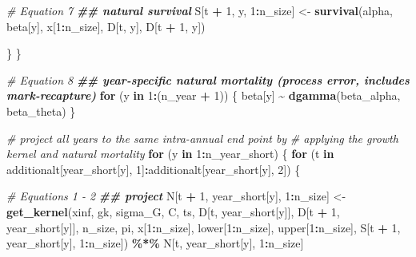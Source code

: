 \documentclass[
]{article}
\newenvironment{Shaded}{\begin{snugshade}}{\end{snugshade}}
\newcommand{\CommentTok}[1]{\textcolor[rgb]{0.56,0.35,0.01}{\textit{#1}}}
\newcommand{\ControlFlowTok}[1]{\textcolor[rgb]{0.13,0.29,0.53}{\textbf{#1}}}
\newcommand{\DecValTok}[1]{\textcolor[rgb]{0.00,0.00,0.81}{#1}}
\newcommand{\DocumentationTok}[1]{\textcolor[rgb]{0.56,0.35,0.01}{\textbf{\textit{#1}}}}
\newcommand{\FunctionTok}[1]{\textcolor[rgb]{0.13,0.29,0.53}{\textbf{#1}}}
\newcommand{\NormalTok}[1]{#1}
\newcommand{\OtherTok}[1]{\textcolor[rgb]{0.56,0.35,0.01}{#1}}
\newcommand{\SpecialCharTok}[1]{\textcolor[rgb]{0.81,0.36,0.00}{\textbf{#1}}}
\begin{document}
\begin{Shaded}
\begin{Highlighting}[]
      \CommentTok{\# Equation 7}
      \DocumentationTok{\#\# natural survival}
\NormalTok{      S[t }\SpecialCharTok{+} \DecValTok{1}\NormalTok{, y, }\DecValTok{1}\SpecialCharTok{:}\NormalTok{n\_size] }\OtherTok{\textless{}{-}} \FunctionTok{survival}\NormalTok{(alpha, beta[y], x[}\DecValTok{1}\SpecialCharTok{:}\NormalTok{n\_size], D[t, y],}
\NormalTok{                                        D[t }\SpecialCharTok{+} \DecValTok{1}\NormalTok{, y])}

\NormalTok{    \}}
\NormalTok{  \}}

  \CommentTok{\# Equation 8}
  \DocumentationTok{\#\# year{-}specific natural mortality (process error, includes mark{-}recapture)}
  \ControlFlowTok{for}\NormalTok{ (y }\ControlFlowTok{in} \DecValTok{1}\SpecialCharTok{:}\NormalTok{(n\_year }\SpecialCharTok{+} \DecValTok{1}\NormalTok{)) \{}
\NormalTok{    beta[y] }\SpecialCharTok{\textasciitilde{}} \FunctionTok{dgamma}\NormalTok{(beta\_alpha, beta\_theta)}
\NormalTok{  \}}

  \CommentTok{\# project all years to the same intra{-}annual end point by}
  \CommentTok{\# applying the growth kernel and natural mortality}
  \ControlFlowTok{for}\NormalTok{ (y }\ControlFlowTok{in} \DecValTok{1}\SpecialCharTok{:}\NormalTok{n\_year\_short) \{}
    \ControlFlowTok{for}\NormalTok{ (t }\ControlFlowTok{in}\NormalTok{ additionalt[year\_short[y], }\DecValTok{1}\NormalTok{]}\SpecialCharTok{:}\NormalTok{additionalt[year\_short[y], }\DecValTok{2}\NormalTok{]) \{}

      \CommentTok{\# Equations 1 {-} 2}
      \DocumentationTok{\#\# project}
\NormalTok{      N[t }\SpecialCharTok{+} \DecValTok{1}\NormalTok{, year\_short[y], }\DecValTok{1}\SpecialCharTok{:}\NormalTok{n\_size] }\OtherTok{\textless{}{-}} \FunctionTok{get\_kernel}\NormalTok{(xinf, gk, sigma\_G,}
\NormalTok{                                                      C, ts,}
\NormalTok{                                                      D[t, year\_short[y]],}
\NormalTok{                                                      D[t }\SpecialCharTok{+} \DecValTok{1}\NormalTok{, year\_short[y]],}
\NormalTok{                                                      n\_size, pi,}
\NormalTok{                                                      x[}\DecValTok{1}\SpecialCharTok{:}\NormalTok{n\_size],}
\NormalTok{                                                      lower[}\DecValTok{1}\SpecialCharTok{:}\NormalTok{n\_size],}
\NormalTok{                                                      upper[}\DecValTok{1}\SpecialCharTok{:}\NormalTok{n\_size],}
\NormalTok{                                                      S[t }\SpecialCharTok{+} \DecValTok{1}\NormalTok{, year\_short[y],}
                                                        \DecValTok{1}\SpecialCharTok{:}\NormalTok{n\_size]) }\SpecialCharTok{\%*\%}
\NormalTok{        N[t, year\_short[y], }\DecValTok{1}\SpecialCharTok{:}\NormalTok{n\_size]}


\end{Highlighting}
\end{Shaded}
\end{document}
